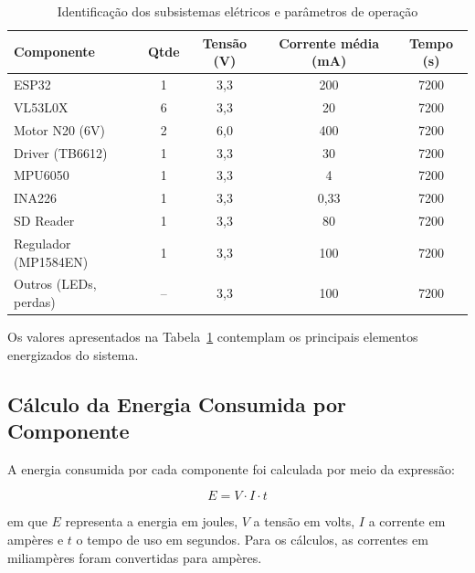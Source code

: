 \begin{table}[htbp]
    \centering
    \caption{Identificação dos subsistemas elétricos e parâmetros de operação}
    \label{tab:subsistemas_eletricos}

    \renewcommand{\arraystretch}{1.2}

    \begin{tabular}{lcccc}
        \hline
        \textbf{Componente} &
        \textbf{Qtde} &
        \textbf{Tensão (V)} &
        \textbf{Corrente média (mA)} &
        \textbf{Tempo (s)} \\
        \hline

        ESP32 & 1 & 3,3 & 200 & 7200 \\
        VL53L0X & 6 & 3,3 & 20 & 7200 \\
        Motor N20 (6V) & 2 & 6,0 & 400 & 7200 \\
        Driver (TB6612) & 1 & 3,3 & 30 & 7200 \\
        MPU6050 & 1 & 3,3 & 4 & 7200 \\
        INA226 & 1 & 3,3 & 0,33 & 7200 \\
        SD Reader & 1 & 3,3 & 80 & 7200 \\
        Regulador (MP1584EN) & 1 & 3,3 & 100 & 7200 \\
        Outros (LEDs, perdas) & -- & 3,3 & 100 & 7200 \\

        \hline
    \end{tabular}
\end{table}

Os valores apresentados na Tabela~\ref{tab:subsistemas_eletricos} contemplam os principais elementos energizados do sistema.

\subsection{Cálculo da Energia Consumida por Componente}
\label{sec:calculo_energia_componente}

A energia consumida por cada componente foi calculada por meio da expressão:

\begin{equation}
E = V \cdot I \cdot t
\end{equation}

em que $E$ representa a energia em joules, $V$ a tensão em volts, $I$ a corrente em ampères e $t$ o tempo de uso em segundos. Para os cálculos, as correntes em miliampères foram convertidas para ampères.

